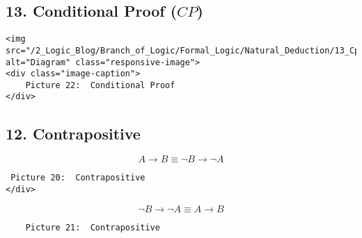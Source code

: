 \subsection{\texorpdfstring{13. Conditional Proof
(\(CP\))}{13. Conditional Proof (CP)}}\label{conditional-proof-cp}

\begin{verbatim}
<img src="/2_Logic_Blog/Branch_of_Logic/Formal_Logic/Natural_Deduction/13_Cp_Intro.png" alt="Diagram" class="responsive-image">
<div class="image-caption">
    Picture 22:  Conditional Proof
</div>
\end{verbatim}

\subsection{12. Contrapositive}\label{contrapositive}

\[ A \rightarrow B \equiv \neg B \rightarrow \neg A\]

\begin{verbatim}
 Picture 20:  Contrapositive
</div>
\end{verbatim}

\[ \neg B \rightarrow \neg A \equiv  A \rightarrow B \]

\begin{verbatim}
    Picture 21:  Contrapositive
\end{verbatim}
